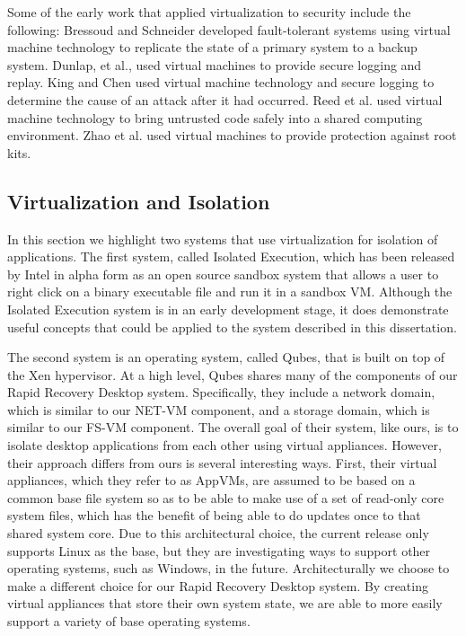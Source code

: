 Some of the early work that applied virtualization to security include the following: Bressoud and Schneider developed fault-tolerant systems using virtual machine technology to replicate the state of a primary system to a backup system\cite{bressoud_1995}. Dunlap, et al., used virtual machines to provide secure logging and replay\cite{dunlap_2002}. King and Chen used virtual machine technology and secure logging to determine the cause of an attack after it had occurred\cite{king_2003}. Reed et al. used virtual machine technology to bring untrusted code safely into a shared computing environment\cite{reed_1999}. Zhao et al. used virtual machines to provide protection against root kits\cite{zhao_2005}.

\subsection{Virtualization and Isolation}

In this section we highlight two systems that use virtualization for isolation of applications. The first system, called Isolated Execution\cite{isolated_execution_2010}, which has been released by Intel in alpha form as an open source sandbox system that allows a user to right click on a binary executable file and run it in a sandbox VM. Although the Isolated Execution system is in an early development stage, it does demonstrate useful concepts that could be applied to the system described in this dissertation.

The second system is an operating system, called Qubes\cite{qubes-os_2010}, that is built on top of the Xen hypervisor. At a high level, Qubes shares many of the components of our Rapid Recovery Desktop system. Specifically, they include a network domain, which is similar to our NET-VM component, and a storage domain, which is similar to our FS-VM component. The overall goal of their system, like ours, is to isolate desktop applications from each other using virtual appliances. However, their approach differs from ours is several interesting ways. First, their virtual appliances, which they refer to as AppVMs, are assumed to be based on a common base file system so as to be able to make use of a set of read-only core system files, which has the benefit of being able to do updates once to that shared system core. Due to this architectural choice, the current release only supports Linux as the base, but they are investigating ways to support other operating systems, such as Windows, in the future. Architecturally we choose to make a different choice for our Rapid Recovery Desktop system. By creating virtual appliances that store their own system state, we are able to more easily support a variety of base operating systems.

